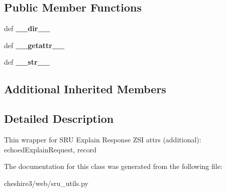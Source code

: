\subsection*{Public Member Functions}
\begin{DoxyCompactItemize}
\item 
\hypertarget{classcheshire3_1_1web_1_1sru__utils_1_1_explain_response_a2187558c23cc9dee4853b777895823f8}{def {\bfseries \-\_\-\-\_\-dir\-\_\-\-\_\-}}\label{classcheshire3_1_1web_1_1sru__utils_1_1_explain_response_a2187558c23cc9dee4853b777895823f8}

\item 
\hypertarget{classcheshire3_1_1web_1_1sru__utils_1_1_explain_response_a080a5985bdf592afbc70e2b21e9e8ca9}{def {\bfseries \-\_\-\-\_\-getattr\-\_\-\-\_\-}}\label{classcheshire3_1_1web_1_1sru__utils_1_1_explain_response_a080a5985bdf592afbc70e2b21e9e8ca9}

\item 
\hypertarget{classcheshire3_1_1web_1_1sru__utils_1_1_explain_response_a2e7e19f1c4fe661a25c071d600137fa2}{def {\bfseries \-\_\-\-\_\-str\-\_\-\-\_\-}}\label{classcheshire3_1_1web_1_1sru__utils_1_1_explain_response_a2e7e19f1c4fe661a25c071d600137fa2}

\end{DoxyCompactItemize}
\subsection*{Additional Inherited Members}


\subsection{Detailed Description}
\begin{DoxyVerb}Thin wrapper for SRU Explain Response
ZSI attrs (additional): echoedExplainRequest, record
\end{DoxyVerb}
 

The documentation for this class was generated from the following file\-:\begin{DoxyCompactItemize}
\item 
cheshire3/web/sru\-\_\-utils.\-py\end{DoxyCompactItemize}

